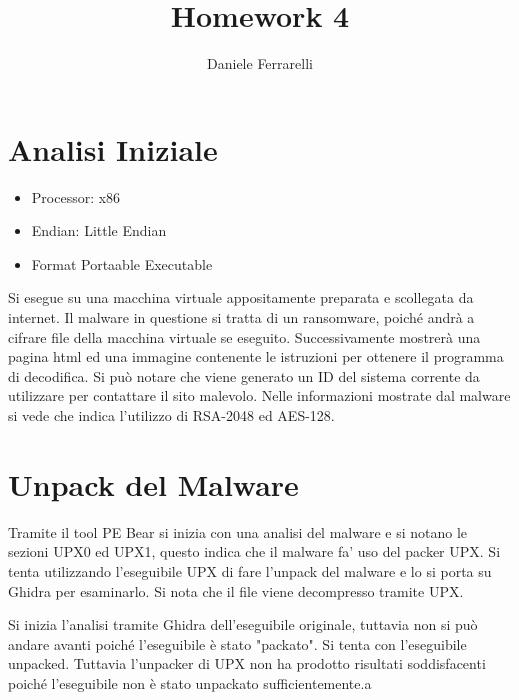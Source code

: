 \documentclass[]{article}
\title{Homework 4}
\author{Daniele Ferrarelli}
\date{}
\begin{document}
\maketitle
\section{Analisi Iniziale}
\begin{itemize}
	\item Processor: x86
	\item Endian: Little Endian
	\item Format Portaable Executable
\end{itemize}


Si esegue su una macchina virtuale appositamente preparata e scollegata  da internet. Il malware in questione si tratta di un ransomware, poiché andrà a cifrare file della macchina virtuale se eseguito. Successivamente mostrerà una pagina html ed una immagine contenente le istruzioni per ottenere il programma di decodifica. Si può notare che viene generato un ID del sistema corrente da utilizzare per contattare il sito malevolo. Nelle informazioni mostrate dal malware si vede che indica l'utilizzo di RSA-2048 ed AES-128. 

\section{Unpack del Malware}
Tramite il tool PE Bear si inizia con una analisi del malware e si notano le sezioni UPX0 ed UPX1, questo indica che il malware fa' uso del packer UPX. Si tenta utilizzando l'eseguibile UPX di fare l'unpack del malware e lo si porta su Ghidra per esaminarlo.  Si nota che il file viene decompresso tramite UPX. 

Si inizia l'analisi tramite Ghidra dell'eseguibile originale, tuttavia non si può andare avanti poiché l'eseguibile è stato "packato". Si tenta con l'eseguibile unpacked. Tuttavia l'unpacker di UPX non ha prodotto risultati soddisfacenti poiché l'eseguibile non è stato unpackato sufficientemente.a
\end{document}
